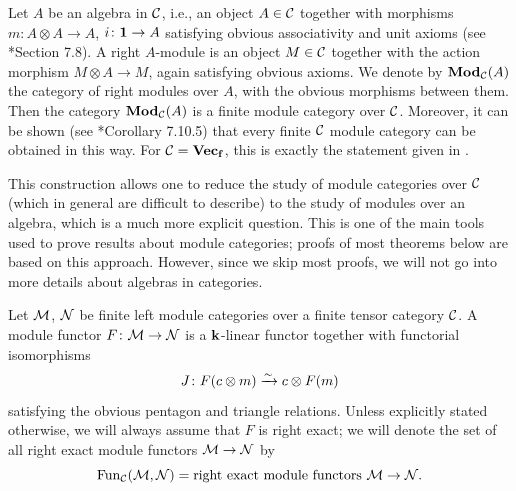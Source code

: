\begin{example}\label{x:algebra-in-cat}
  Let $A$ be an algebra in $\mathcal{C}$, i.e., an object $A\in \mathcal{C}$ together with
  morphisms $m\colon A\otimes A\to A$, $i\colon \mathbf{1}\to A$ satisfying obvious
  associativity and unit axioms (see *{Section 7.8}). A
  right $A$-module is an object $M\in \mathcal{C}$ together with the action morphism
  $M\otimes A\to M$, again satisfying obvious axioms. We denote by
  $\mathbf{Mod}_{\mathcal{C}}(A)$ the category of right modules over $A$, with the obvious
  morphisms between them. Then the category $\mathbf{Mod}_{\mathcal{C}}(A)$ is a finite module
  category over $\mathcal{C}$. Moreover, it can be shown (see
  *{Corollary 7.10.5}) that every finite $\mathcal{C}$ module
  category can be obtained in this way. For $\mathcal{C}=\mathbf{Vec_f}$, this is exactly the
  statement given in .

  This construction allows one to reduce the study of module categories over
  $\mathcal{C}$ (which in general are difficult to describe) to the study of modules
  over an algebra, which is a much more explicit question. This is one of the
  main tools used to prove results about module categories; proofs of most
  theorems below are based on this approach. However, since we skip most
  proofs, we will not go into more details about algebras in categories.
\end{example}


\begin{definition}\label{d:module-functor}
  Let $\mathcal{M}$, $\mathcal{N}$ be finite left module categories over a finite tensor
  category $\mathcal{C}$. A module functor $F\colon \mathcal{M}\to \mathcal{N}$ is a $\mathbf{k}$-linear
  functor together with functorial isomorphisms
  $$
    J\colon F(c\otimes m)\xrightarrow{\sim} c\otimes F(m)
  $$
  satisfying the obvious pentagon and triangle relations. Unless explicitly
  stated otherwise, we will always assume that $F$ is right exact; we will
  denote the set of all right exact module functors $\mathcal{M}\to \mathcal{N}$ by
  $$
    \operatorname{Fun}_{\mathcal{C}}(\mathcal{M}, \mathcal{N})=\text{right exact module functors }\mathcal{M}\to\mathcal{N}.
  $$
\end{definition}


